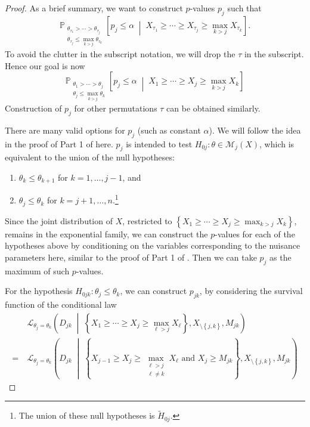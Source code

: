 \documentclass[11pt]{article}
\theoremstyle{definition}
\theoremstyle{custom}
\newcommand{\PP}{\mathbb{P}}
\begin{document}
\begin{proof}
As a brief summary, we want to construct $p$-values $p_j$ such that
$$\PP_{\substack{\theta_{\tau_1} > \cdots > \theta_{\tau_j} \\ \theta_{\tau_j} \le \max_{k>j} \theta_{\tau_k}}} \left[p_j \le \alpha \;\middle|\; X_{\tau_1} \ge \cdots \ge X_{\tau_j} \ge \max_{k>j} X_{\tau_k}\right].$$
To avoid the clutter in the subscript notation, we will drop the $\tau$ in the subscript. Hence our goal is now
$$\PP_{\substack{\theta_1 > \cdots > \theta_j \\ \theta_j \le \max_{k>j} \theta_k}} \left[p_j \le \alpha \;\middle|\; X_1 \ge \cdots \ge X_j \ge \max_{k>j} X_k\right]$$
Construction of $p_j$ for other permutations $\tau$ can be obtained similarly.

There are many valid options for $p_j$ (such as constant $\alpha$). We will follow the idea in the proof of Part 1 of  here. $p_j$ is intended to test $H_{0j}: \theta \in \mathcal{M}_j\left(X\right)$, which is equivalent to the union of the null hypotheses:
\begin{enumerate}
\item $\theta_k \le \theta_{k+1}$ for $k = 1, \ldots, j-1$, and
\item $\theta_j \le \theta_k$ for $k = j+1, \ldots, n$.\footnote{The union of these null hypotheses is $\widetilde{H}_{0j}$.}
\end{enumerate}

Since the joint distribution of $X$, restricted to $\left\{X_1 \ge \cdots \ge X_j \ge \max_{k>j} X_k\right\}$, remains in the exponential family, we can construct the $p$-values for each of the hypotheses above by conditioning on the variables corresponding to the nuisance parameters here, similar to the proof of Part 1 of . Then we can take $p_j$ as the maximum of such $p$-values.

For the hypothesis $H_{0jk}: \theta_j \le \theta_k$, we can construct $p_{jk}$, by considering the survival function of the conditional law
\begin{align*}
&~ \mathcal{L}_{\theta_j = \theta_k} \left(D_{jk} \;\middle|\; \left\{X_1 \ge \cdots \ge X_j \ge \max_{\ell>j} X_\ell\right\}, X_{\setminus\left\{j, k\right\}}, M_{jk}\right) \\
= &~ \mathcal{L}_{\theta_j = \theta_k} \left(D_{jk} \;\middle|\; \left\{X_{j-1} \ge X_j \ge \max_{\substack{\ell>j \\ \ell \ne k}} X_\ell \text{ and } X_j \ge M_{jk}\right\}, X_{\setminus\left\{j, k\right\}}, M_{jk}\right)
\end{align*}


\end{proof}
\end{document}
